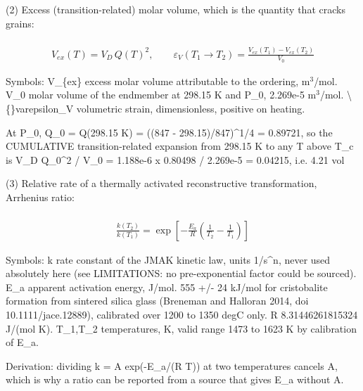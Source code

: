 \documentclass[10pt,a4paper,twoside]{report}
\begin{document}
(2) Excess (transition-related) molar volume, which is the quantity that cracks grains:

\begin{equation*}
\begin{gathered}
\\ V_{ex}(T) = V_D\,Q(T)^2, \qquad \varepsilon_{V}(T_1 \to T_2) = \frac{V_{ex}(T_1) - V_{ex}(T_2)}{V_0}
\end{gathered}
\end{equation*}

Symbols: V\_\{ex\}          excess molar volume attributable to the ordering, m$^{3}$/mol. V\_0             molar volume of the endmember at 298.15 K and P\_0, 2.269e-5 m$^{3}$/mol. \textbackslash\{\}varepsilon\_V   volumetric strain, dimensionless, positive on heating.

\begin{verbatimsmall}
At P_0, Q_0 = Q(298.15 K) = ((847 - 298.15)/847)^{1/4} = 0.89721, so the CUMULATIVE
transition-related expansion from 298.15 K to any T above T_c is
V_D Q_0^2 / V_0 = 1.188e-6 x 0.80498 / 2.269e-5 = 0.04215, i.e. 4.21 vol%
\end{verbatimsmall}

(3) Relative rate of a thermally activated reconstructive transformation, Arrhenius ratio:

\begin{equation*}
\begin{gathered}
\\ \frac{k(T_2)}{k(T_1)} = \exp\!\left[-\frac{E_a}{R} \left(\frac{1}{T_2} - \frac{1}{T_1}\right)\right]
\end{gathered}
\end{equation*}

Symbols: k       rate constant of the JMAK kinetic law, units 1/s\textasciicircum{}n, never used absolutely here (see LIMITATIONS: no pre-exponential factor could be sourced). E\_a     apparent activation energy, J/mol. 555 +/- 24 kJ/mol for cristobalite formation from sintered silica glass (Breneman and Halloran 2014, doi 10.1111/jace.12889), calibrated over 1200 to 1350 degC only. R       8.31446261815324 J/(mol K). T\_1,T\_2 temperatures, K, valid range 1473 to 1623 K by calibration of E\_a.

\begin{verbatimsmall}
Derivation: dividing k = A exp(-E_a/(R T)) at two temperatures cancels A, which is why
a ratio can be reported from a source that gives E_a without A.
\end{verbatimsmall}
\end{document}
